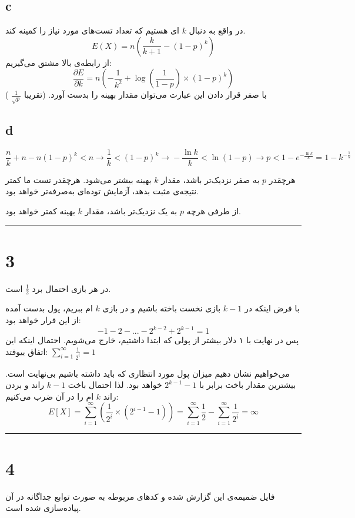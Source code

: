 \documentclass{article}
\begin{document}
\subsection*{c}
در واقع به دنبال
$k$
ای هستیم که تعداد تست‌های مورد نیاز را کمینه کند.
$$ E(X) = n \left( \frac{k}{k+1} - (1 - p)^k \right) $$
از رابطه‌ی بالا مشتق می‌گیریم:
$$\frac{\partial E}{\partial k} = n \left(- \frac{1}{k^2} + \log(\frac{1}{1-p}) \times (1-p)^k \right)$$
با صفر قرار دادن این عبارت می‌توان مقدار بهینه را بدست آورد. (تقریبا
$\frac{1}{\sqrt{p}}$
)

\subsection*{d}
$$\frac{n}{k} + n - n(1-p)^k < n \xrightarrow{} \frac{1}{k} < (1-p)^k \xrightarrow{} - \frac{\ln k}{k} < \ln(1-p) \xrightarrow{} p < 1 - e^{- \frac{\ln k}{k}} = 1 - k^{- \frac{1}{k}}$$

هرچقدر
$p$
به صفر نزدیک‌تر باشد، مقدار
$k$
بهینه بیشتر می‌شود. هرچقدر تست ما کمتر نتیجه‌ی مثبت بدهد، آزمایش توده‌ای به‌صرفه‌تر خواهد بود.

از طرفی هرچه
$p$
به یک نزدیک‌تر باشد، مقدار
$k$
بهینه کمتر خواهد بود.

\rule{\linewidth}{1pt}

\section*{3}

در هر بازی احتمال برد
$\frac{1}{2}$
است.

با فرض اینکه در
$k-1$
بازی نخست باخته باشیم و در بازی
$k$
ام ببریم، پول بدست آمده از این قرار خواهد بود:
$$-1-2-...-2^{k-2}+2^{k-1} = 1$$
پس در نهایت با ۱ دلار بیشتر از پولی که ابتدا داشتیم، خارج می‌شویم. احتمال اینکه این اتفاق بیوفتد:
$\sum^{\infty}_{i=1}\frac{1}{2^i} = 1$

می‌خواهیم نشان دهیم میزان پول مورد انتظاری که باید داشته باشیم بی‌نهایت است. بیشترین مقدار باخت برابر با
$2^{k-1} - 1$
خواهد بود. لذا احتمال باخت
$k-1$
راند و بردن راند
$k$
ام را در آن ضرب می‌کنیم:
$$E[X] = \sum^{\infty}_{i=1} \left(\frac{1}{2^i} \times \left(2^{i-1}-1\right) \right) = \sum^{\infty}_{i=1} \frac{1}{2} - \sum^{\infty}_{i=1} \frac{1}{2^i} = \infty$$
\rule{\linewidth}{1pt}

\section*{4}
فایل
ضمیمه‌ی این گزارش شده و کدهای مربوطه به صورت توابع جداگانه در آن پیاده‌سازی شده است.
\end{document}
